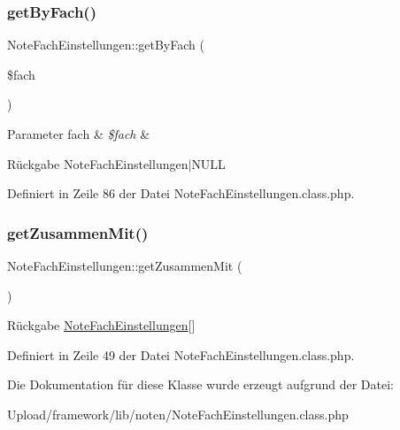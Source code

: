 \subsubsection{\texorpdfstring{get\+By\+Fach()}{getByFach()}}
{\footnotesize\ttfamily Note\+Fach\+Einstellungen\+::get\+By\+Fach (\begin{DoxyParamCaption}\item[{}]{\$fach }\end{DoxyParamCaption})}


\begin{DoxyParams}[1]{Parameter}
fach & {\em \$fach} & \\
\hline
\end{DoxyParams}
\begin{DoxyReturn}{Rückgabe}
Note\+Fach\+Einstellungen$\vert$\+N\+U\+LL 
\end{DoxyReturn}


Definiert in Zeile 86 der Datei Note\+Fach\+Einstellungen.\+class.\+php.

\mbox{\label{class_note_fach_einstellungen_a133fb2708c5300d6a3b1d63d0f7b081f}} 
\subsubsection{\texorpdfstring{get\+Zusammen\+Mit()}{getZusammenMit()}}
{\footnotesize\ttfamily Note\+Fach\+Einstellungen\+::get\+Zusammen\+Mit (\begin{DoxyParamCaption}{ }\end{DoxyParamCaption})}

\begin{DoxyReturn}{Rückgabe}
\mbox{\hyperlink{class_note_fach_einstellungen}{Note\+Fach\+Einstellungen}}\mbox{[}\mbox{]} 
\end{DoxyReturn}


Definiert in Zeile 49 der Datei Note\+Fach\+Einstellungen.\+class.\+php.



Die Dokumentation für diese Klasse wurde erzeugt aufgrund der Datei\+:\begin{DoxyCompactItemize}
\item 
Upload/framework/lib/noten/Note\+Fach\+Einstellungen.\+class.\+php\end{DoxyCompactItemize}
